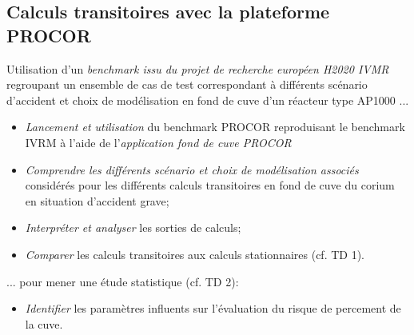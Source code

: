 \subsection{Calculs transitoires avec la plateforme PROCOR}
\begin{frame}[fragile]
	Utilisation d'un \emph{benchmark issu du projet de recherche européen H2020 IVMR} regroupant un ensemble de cas de test correspondant à différents scénario d'accident et choix de modélisation en fond de cuve d'un réacteur type AP1000 ...
	\begin{itemize}
	\item \emph{Lancement et utilisation} du benchmark PROCOR reproduisant le benchmark IVRM à l'aide de l'\emph{application fond de cuve PROCOR}
	\item \emph{Comprendre les différents scénario et choix de modélisation associés} considérés pour les différents calculs transitoires en fond de cuve du corium en situation d'accident grave;
	\item \emph{Interpréter et analyser} les sorties de calculs;
	\item \emph{Comparer} les calculs transitoires aux calculs stationnaires (cf. TD 1).
	\end{itemize}
	... pour mener une étude statistique (cf. TD 2):
	\begin{itemize}
	\item \emph{Identifier} les paramètres influents sur l'évaluation du risque de percement de la cuve.
	\end{itemize}
\end{frame}
